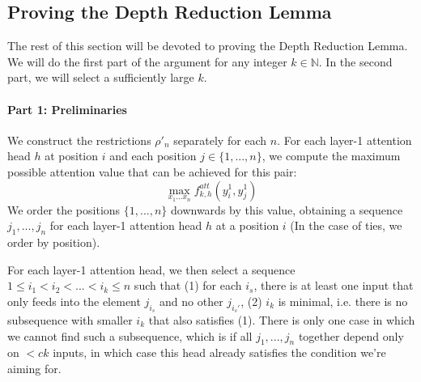 \documentclass[11pt,a4paper]{article}
\begin{document}

\subsection{Proving the Depth Reduction Lemma}
The rest of this section will be devoted to proving the Depth Reduction Lemma.
We will do the first part of the argument for any integer $k \in \mathbb{N}$.
In the second part, we will select a sufficiently large $k$.

\paragraph{Part 1: Preliminaries}


We construct the restrictions $\rho'_n$ separately for each $n$.
For each layer-1 attention head $h$ at position $i$ and each position $j \in \{1, ..., n\}$, we compute the maximum possible attention value that can be achieved for this pair:
\begin{equation}
\max_{x_1\dots x_n} f^{att}_{k,h}(y_i^{1}, y^{1}_j)
\end{equation}
We order the positions $\{1, ..., n\}$ downwards by this value, obtaining a sequence $j_1, ..., j_n$ for each layer-1 attention head $h$ at a position $i$ (In the case of ties, we order by  position).

For each layer-1 attention head, we then select a sequence $1 \leq i_1 < i_2 < ... < i_k \leq n$ such that (1) for each $i_s$, there is at least one input that only feeds into the element $j_{i_s}$ and no other $j_{i_s'}$, (2) $i_k$ is minimal, i.e. there is no subsequence with smaller $i_k$ that also satisfies (1).
There is only one case in which we cannot find such a subsequence, which is if all $j_1, ..., j_n$ together depend only on $< ck$ inputs, in which case this head already satisfies the condition we're aiming for.
\end{document}
